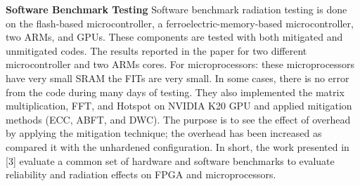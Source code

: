 \textbf{Software Benchmark Testing}
Software benchmark radiation testing is done on the flash-based microcontroller,  a ferroelectric-memory-based microcontroller, two ARMs, and GPUs. These components are tested with both mitigated and unmitigated codes. The results reported in the paper for two different microcontroller and two ARMs cores. For microprocessors: these microprocessors have very small SRAM the FITs are very small. In some cases, there is no error from the code during many days of testing. They also implemented the matrix multiplication, FFT, and Hotspot on NVIDIA K20 GPU and applied mitigation methods (ECC, ABFT, and DWC).  The purpose is to see the effect of overhead by applying the mitigation technique; the overhead has been increased as compared it with the unhardened configuration.
In short, the work presented in [3] evaluate a common set of hardware and software benchmarks to evaluate reliability and radiation effects on FPGA and microprocessors.








